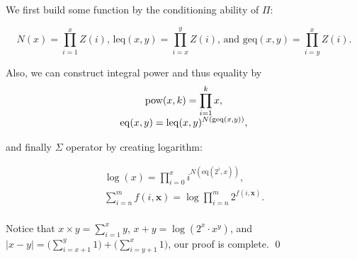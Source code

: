 
\begin{pf} \rm
  We first build some function by the conditioning ability of $\Pi$:

\[
  N(x) = \prod_{i=1}^{x} Z(i)\textrm{, }
  \mathrm{leq}(x, y) = \prod_{i = x}^y Z(i)\textrm{, and }
  \mathrm{geq}(x, y) = \prod_{i = y}^x Z(i).
\]

\noindent Also, we can construct integral power and thus equality by
\[
 \begin{array}{c}
    \displaystyle \mathrm{pow}(x, k)  = \prod_{i = 1}^{k} x, \\
    \displaystyle \mathrm{eq}(x, y) = \mathrm{leq}(x, y) ^ {N( \mathrm{geq}(x, y))}, \\
 \end{array}
\]

\noindent and finally $\Sigma$ operator by creating logarithm:

\[
 \begin{array}{c}
    \displaystyle \log (x) = \prod_{i = 0}^{x} i^{N(\mathrm{eq}(2^i, x))}, \\
    \displaystyle \sum_{i=n}^{m} f(i, \mathbf{x}) = \log \prod_{i=n}^{m} 2^{f(i, \mathbf{x})}. \\
 \end{array}
\]

\noindent Notice that
$\displaystyle x\times y = \sum_{i=1}^x y$,
$x + y = \log(2^x\cdot x^y)$, and
$\displaystyle |x-y| = \Big( \sum_{i=x+1}^y 1 \Big) + \Big( \sum_{i=y+1}^x 1 \Big)$,
our proof is complete. \qed
\end{pf}


